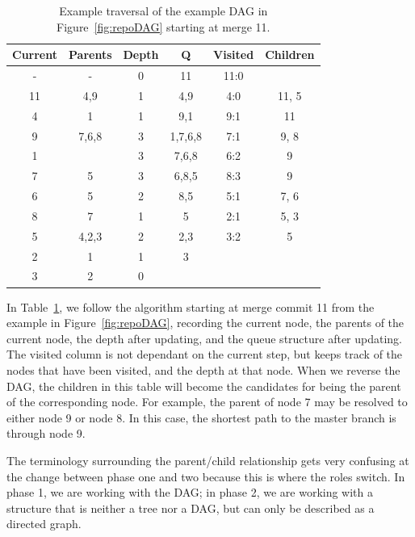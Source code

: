 \begin{table}[htpb]
  \centering
  \caption{Example traversal of the example DAG in
    Figure~\ref{fig:repoDAG} starting at merge 11.}
  \label{tab:ex_traversal}
  \begin{tabular}{cccc|cc}
    \toprule
    Current & Parents & Depth & Q       & Visited & Children\\\midrule
    -       & -       & 0     & 11      & 11:0    & \\
    11      & 4,9     & 1     & 4,9     & 4:0     & 11, 5\\
    4       & 1       & 1     & 9,1     & 9:1     & 11\\
    9       & 7,6,8   & 3     & 1,7,6,8 & 7:1     & 9, 8\\
    1       &         & 3     & 7,6,8   & 6:2     & 9\\
    7       & 5       & 3     & 6,8,5   & 8:3     & 9\\
    6       & 5       & 2     & 8,5     & 5:1     & 7, 6\\
    8       & 7       & 1     & 5       & 2:1     & 5, 3\\
    5       & 4,2,3   & 2     & 2,3     & 3:2     & 5\\
    2       & 1       & 1     & 3       &         & \\
    3       & 2       & 0     &         &         & \\
    \bottomrule
  \end{tabular}
\end{table}

In Table~\ref{tab:ex_traversal}, we follow the algorithm starting at
merge commit 11 from the example in Figure~\ref{fig:repoDAG}, recording
the current node, the parents of the current node, the depth after
updating, and the queue structure after updating. The visited column is
not dependant on the current step, but keeps track of the nodes that
have been visited, and the depth at that node. When we reverse the DAG,
the children in this table will become the candidates for being the
parent of the corresponding node. For example, the parent of node 7 may
be resolved to either node 9 or node 8. In this case, the shortest path
to the master branch is through node 9.

The terminology surrounding the parent/child relationship gets very
confusing at the change between phase one and two because this is where
the roles switch. In phase 1, we are working with the DAG; in phase 2,
we are working with a structure that is neither a tree nor a DAG, but
can only be described as a directed graph.

